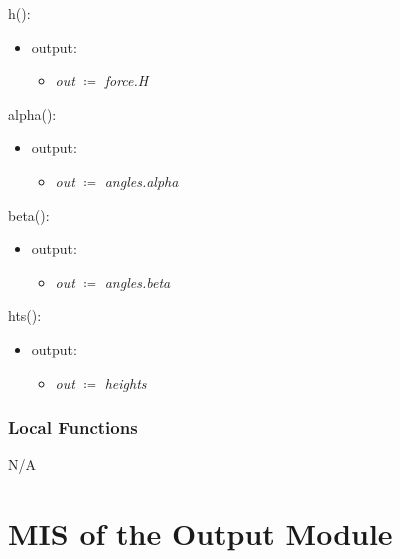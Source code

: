 \documentclass[12pt, titlepage]{article}
\begin{document}
\noindent h():
\begin{itemize}
\item output:
\begin{itemize}
	\item[] \textit{out} $\coloneqq$ \textit{force.H}\\
\end{itemize}
\end{itemize}

\noindent alpha():
\begin{itemize}
	\item output:
	\begin{itemize}
		\item[] \textit{out} $\coloneqq$ \textit{angles.alpha}\\
	\end{itemize}
\end{itemize}

\noindent beta():
\begin{itemize}
	\item output:
	\begin{itemize}
		\item[] \textit{out} $\coloneqq$ \textit{angles.beta}\\
	\end{itemize}
\end{itemize}

\noindent hts():
\begin{itemize}
	\item output:
	\begin{itemize}
		\item[] \textit{out} $\coloneqq$ \textit{heights}\\
	\end{itemize}
\end{itemize}

\subsubsection{Local Functions}
N/A


\section{MIS of the Output Module} \label{sec:OutputMod}
\end{document}
